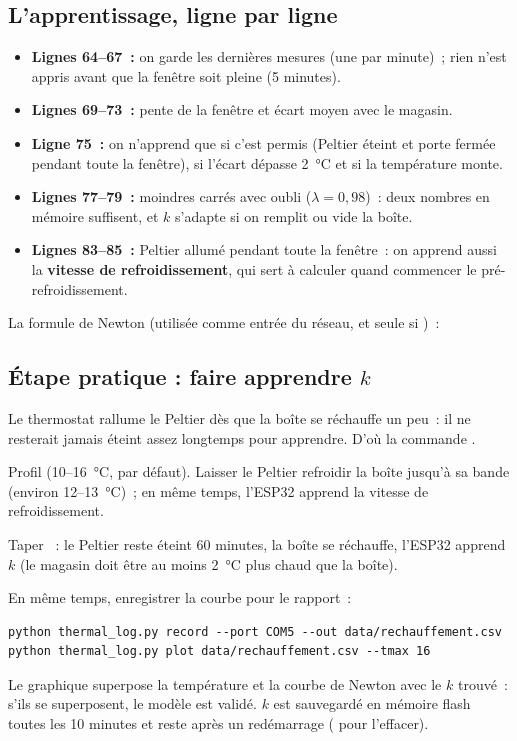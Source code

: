 \subsection{L'apprentissage, ligne par ligne}

\begin{itemize}
  \item \textbf{Lignes 64--67~:} on garde les dernières mesures (une par minute)~; rien n'est appris avant que la fenêtre soit pleine (5 minutes).
  \item \textbf{Lignes 69--73~:} pente de la fenêtre et écart moyen avec le magasin.
  \item \textbf{Ligne 75~:} on n'apprend que si c'est permis (Peltier éteint et porte fermée pendant toute la fenêtre), si l'écart dépasse 2~°C et si la température monte.
  \item \textbf{Lignes 77--79~:} moindres carrés avec oubli ($\lambda = 0{,}98$)~: deux nombres en mémoire suffisent, et $k$ s'adapte si on remplit ou vide la boîte.
  \item \textbf{Lignes 83--85~:} Peltier allumé pendant toute la fenêtre~: on apprend aussi la \textbf{vitesse de refroidissement}, qui sert à calculer quand commencer le pré-refroidissement.
\end{itemize}

La formule de Newton (utilisée comme entrée du réseau, et seule si )~:


\subsection{Étape pratique : faire apprendre $k$}
Le thermostat rallume le Peltier dès que la boîte se réchauffe un peu~: il ne resterait jamais éteint assez longtemps pour apprendre. D'où la commande .
\begin{steps}
  \item Profil  (10--16~°C, par défaut). Laisser le Peltier refroidir la boîte jusqu'à sa bande (environ 12--13~°C)~; en même temps, l'ESP32 apprend la vitesse de refroidissement.
  \item Taper ~: le Peltier reste éteint 60 minutes, la boîte se réchauffe, l'ESP32 apprend $k$ (le magasin doit être au moins 2~°C plus chaud que la boîte).
  \item En même temps, enregistrer la courbe pour le rapport~:
\end{steps}
\begin{lstlisting}[style=cmd]
python thermal_log.py record --port COM5 --out data/rechauffement.csv
python thermal_log.py plot data/rechauffement.csv --tmax 16
\end{lstlisting}
Le graphique superpose la température et la courbe de Newton avec le $k$ trouvé~: s'ils se superposent, le modèle est validé. $k$ est sauvegardé en mémoire flash toutes les 10 minutes et reste après un redémarrage ( pour l'effacer).


